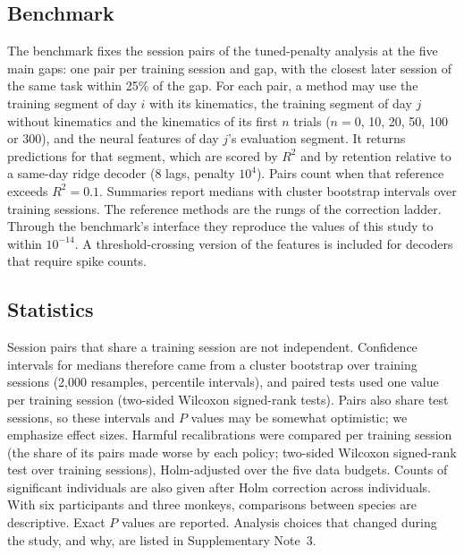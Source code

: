 \documentclass[pdflatex,sn-nature]{sn-jnl}
\begin{document}
\subsection*{Benchmark}

The benchmark fixes the session pairs of the tuned-penalty analysis at the five main gaps: one pair per training session
and gap, with the closest later session of the same task within 25\% of the gap. For each pair, a method may use the
training segment of day $i$ with its kinematics, the training segment of day $j$ without kinematics and the kinematics of
its first $n$ trials ($n = 0$, 10, 20, 50, 100 or 300), and the neural features of day $j$'s evaluation segment. It
returns predictions for that segment, which are scored by $R^2$ and by retention relative to a same-day ridge decoder
(8 lags, penalty $10^4$). Pairs count when that reference exceeds $R^2 = 0.1$. Summaries report medians with cluster
bootstrap intervals over training sessions. The reference methods are the rungs of the correction ladder. Through the
benchmark's interface they reproduce the values of this study to within $10^{-14}$. A threshold-crossing version of the
features is included for decoders that require spike counts.

\subsection*{Statistics}

Session pairs that share a training session are not independent. Confidence intervals for medians therefore came from a
cluster bootstrap over training sessions\cite{field2007} (2,000 resamples, percentile intervals), and paired tests used
one value per training session (two-sided Wilcoxon signed-rank tests). Pairs also share test sessions, so these
intervals and $P$ values may be somewhat optimistic; we emphasize effect sizes. Harmful recalibrations were compared
per training session (the share of its pairs made worse by each policy; two-sided Wilcoxon signed-rank test over training
sessions), Holm-adjusted over the five data budgets\cite{holm1979}. Counts of significant individuals are also given after
Holm correction across individuals. With six participants and three monkeys, comparisons between species are
descriptive. Exact $P$ values are reported. Analysis choices that changed during the study, and why, are listed in
Supplementary Note~3.
\end{document}
